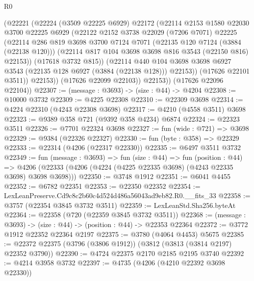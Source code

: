 \begin{lexlean}{R0}
\begin{coremodule}
              (@22221
                (@22224
                  (@3509 @22225 @6929)
                  @22172
                  (@22114
                    @2153
                    @1580
                    @22030
                    @3700
                    @22225
                    @6929
                    (@22122
                      @2152
                      @3738
                      @22029
                      (@7206 @7071)
                      @22225
                      (@22114
                        @286
                        @819
                        @3698
                        @3700
                        @7124
                        @7071
                        (@22135 @120 @7124 (@3884 (@22138 @120)))
                        (@22114 @817 @104 @3698 @3698 @816 @3543 (@22150 @816) @22153))
                      (@17618 @3732 @815))
                    (@22114
                      @440
                      @104
                      @3698
                      @3698
                      @6927
                      @3543
                      (@22135 @128 @6927 (@3884 (@22138 @128)))
                      @22153))
                  (@17626 @22101 @3511))
                @22153))
            (@17626 @22099 @22103))
          @22153))
      (@17626 @22096 @22104))
@22307 := (message : @3693) -> (size : @44) -> @4204
@22308 := @10000 @3732
@22309 := @4225 @22308
@22310 := @22309 @3698
@22314 := @4224 @22310 (@4243 @22308 @3698)
@22317 := @4210 (@4558 @3511) @3698
@22323 := @9389 @358 @721 (@9392 @358 @4234) @6874
@22324 := @22323 @3511
@22326 := @7701 @22324 @3698
@22327 := fun (wide : @721) => @3698
@22329 := @9384 (@22326 @22327)
@22330 := fun (byte : @358) => @22329
@22333 := @22314 (@4206 (@22317 @22330))
@22335 := @6497 @3511 @3732
@22349 := fun (message : @3693) =>
  fun (size : @44) =>
  fun (position : @44) =>
  @4206 (@22333 (@4206 (@4224 (@4225 @22335 @3698) (@4243 @22335 @3698) @3698 @3698)))
@22350 := @3748 @1912
@22351 := @6041 @4455
@22352 := @6782 @22351
@22353 := @22350 @22352
@22354 := LexLeanPreserve.Cd9c8c2b60c4d524d486a56043ad9eb82.R0.__fits_33
@22358 := @3757 (@22354 @3845 @3732 @3511)
@22359 := LexLeanStd.Sha256.byteAt
@22364 := @22358 (@720 (@22359 @3845 @3732 @3511))
@22368 := (message : @3693) -> (size : @44) -> (position : @44) -> @22353 @22364
@22372 := @3772 @1912 @22352 @22364 @2197
@22375 := @3780 (@4064 @4453) @5675
@22385 := @22372 @22375 (@3796 (@3806 @1912)) (@3812 (@3813 (@3814 @2197) @22352 @3790))
@22390 := @4724 @22375 @2170 @2185 @2195 @3740
@22392 := @4214 @3958 @3732
@22397 := @4735 (@4206 (@4210 @22392 @3698 @22330))

\end{coremodule}
\end{lexlean}
